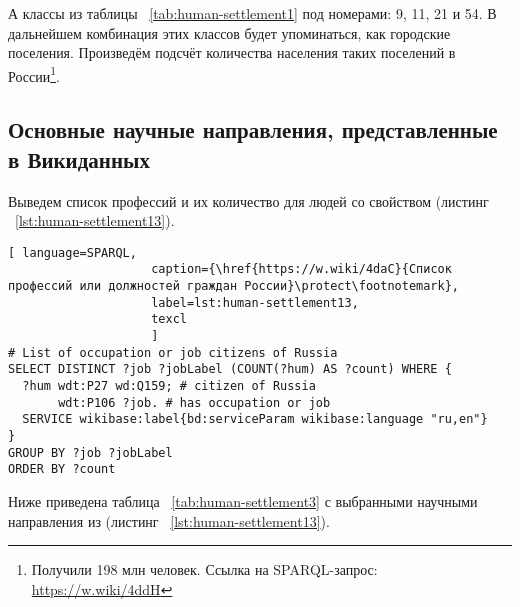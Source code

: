 А классы из таблицы ~\ref{tab:human-settlement1} под номерами: 9, 11, 21 и 54. В дальнейшем комбинация этих классов будет упоминаться, как городские поселения. Произведём подсчёт количества населения таких поселений в России\footnote{Получили 198 млн человек. Ссылка на SPARQL-запрос: \href{https://w.wiki/4ddH}{https://w.wiki/4ddH}}.

\subsection{Основные научные направления, представленные в Викиданных}

Выведем список профессий и их количество для людей со свойством   (листинг ~\protect\ref{lst:human-settlement13}). 

\lstset{numbers=left, firstnumber=1, frame=single}
\begin{lstlisting}[ language=SPARQL, 
                    caption={\href{https://w.wiki/4daC}{Список профессий или должностей граждан России}\protect\footnotemark},
                    label=lst:human-settlement13,
                    texcl 
                    ]
# List of occupation or job citizens of Russia 
SELECT DISTINCT ?job ?jobLabel (COUNT(?hum) AS ?count) WHERE {
  ?hum wdt:P27 wd:Q159; # citizen of Russia 
       wdt:P106 ?job. # has occupation or job
  SERVICE wikibase:label{bd:serviceParam wikibase:language "ru,en"}
}
GROUP BY ?job ?jobLabel
ORDER BY ?count
\end{lstlisting}%

Ниже приведена таблица ~\ref{tab:human-settlement3} с выбранными научными направления из (листинг ~\protect\ref{lst:human-settlement13}).

